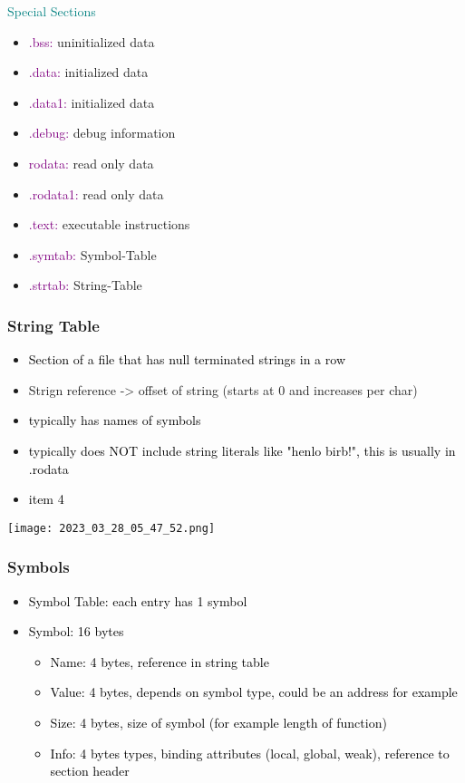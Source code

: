\documentclass[main.tex,fontsize=8pt,paper=a4,paper=portrait,DIV=calc,]{scrartcl}
\begin{document}
\textcolor{teal}{Special Sections}
\begin{itemize}
  \item \textcolor{purple}{.bss:} uninitialized data
  \item \textcolor{purple}{.data:} initialized data
  \item \textcolor{purple}{.data1:} initialized data
  \item \textcolor{purple}{.debug:} debug information
\item \textcolor{purple}{rodata:} read only data
\item \textcolor{purple}{.rodata1: } read only data
\item \textcolor{purple}{.text: } executable instructions 
\item \textcolor{purple}{.symtab: } Symbol-Table 
\item \textcolor{purple}{.strtab: } String-Table 
\end{itemize} 

\subsubsection{String Table}
\begin{itemize}
\item \textcolor{black}{Section of a file that has null terminated strings in a row}
\item Strign reference -> offset of string (starts at 0 and increases per char) 
\item \textcolor{black}{typically has names of symbols}
\item \textcolor{black}{typically does NOT include string literals like "henlo birb!", this is usually in .rodata}
\item \textcolor{black}{item 4}
\end{itemize} 
\texttt{[image: 2023\_03\_28\_05\_47\_52.png]}

\subsubsection{Symbols}
\begin{itemize}
\item \textcolor{black}{Symbol Table: each entry has 1 symbol}
\item \textcolor{black}{Symbol: 16 bytes}\newline
  \begin{itemize}
  \item \textcolor{black}{Name: 4 bytes, reference in string table}
  \item \textcolor{black}{Value: 4 bytes, depends on symbol type, could be an address for example}
  \item \textcolor{black}{Size: 4 bytes, size of symbol (for example length of function)}
  \item \textcolor{black}{Info: 4 bytes types, binding attributes (local, global, weak), reference to section header}
  \end{itemize} 
\end{itemize} 
\end{document}
